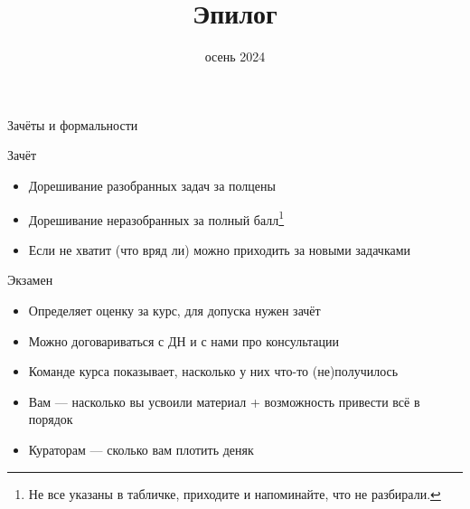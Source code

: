 
\newif\ifhandout




\title[Эпилог]{Эпилог}
\date{осень 2024}



    \setcounter{framenumber}{-1}
    \mymaketitle

    \begin{frame}[fragile]{Зачёты и формальности}
        \begin{block}{Зачёт}
            \begin{itemize}
                \item Дорешивание разобранных задач за полцены
                \item Дорешивание неразобранных за полный балл\footnote{Не все указаны в табличке, приходите и напоминайте, что не разбирали.}
                \item Если не хватит (что вряд ли) можно приходить за новыми задачками
            \end{itemize}
        \end{block}
        \begin{block}{Экзамен}
            \begin{itemize}
                \item Определяет оценку за курс, для допуска нужен зачёт
                \item Можно договариваться с ДН и с нами про консультации
                \item Команде курса показывает, насколько у них что-то (не)получилось
                \item Вам --- насколько вы усвоили материал + возможность привести всё в порядок
                \item Кураторам --- сколько вам плотить деняк
            \end{itemize}
        \end{block}
    \end{frame}

